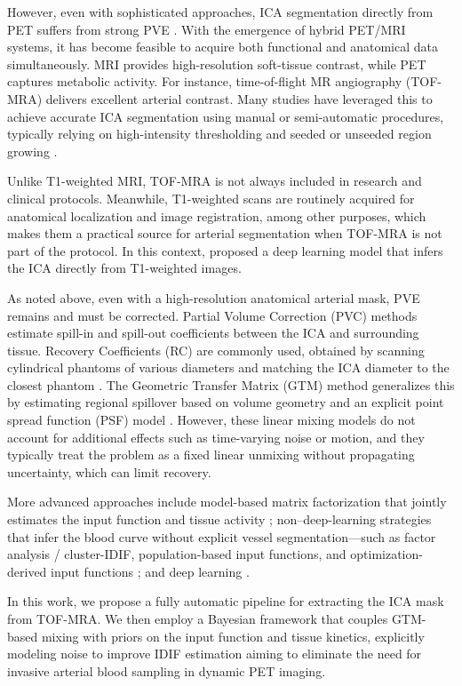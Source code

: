 However, even with sophisticated approaches, ICA segmentation directly from PET suffers from strong PVE \cite{zanotti2011image,boellaard2004effects}.
With the emergence of hybrid PET/MRI systems, it has become feasible to acquire both functional and anatomical data simultaneously.
MRI provides high-resolution soft-tissue contrast, while PET captures metabolic activity.
For instance, time-of-flight MR angiography (TOF-MRA) delivers excellent arterial contrast.
Many studies have leveraged this to achieve accurate ICA segmentation using manual or semi-automatic procedures, typically relying on high-intensity thresholding and seeded or unseeded region growing \cite{feng2015image,sundar2019towards,sari2017estimation,jochimsen2016fully}.

Unlike T1-weighted MRI, TOF-MRA is not always included in research and clinical protocols.
Meanwhile, T1-weighted scans are routinely acquired for anatomical localization and image registration, among other purposes, which makes them a practical source for arterial segmentation when TOF-MRA is not part of the protocol.
In this context, \citeauthor{rahman2024deep} \cite{rahman2024deep} proposed a deep learning model that infers the ICA directly from T1-weighted images.

As noted above, even with a high-resolution anatomical arterial mask, PVE remains and must be corrected.
Partial Volume Correction (PVC) methods estimate spill-in and spill-out coefficients between the ICA and surrounding tissue.
Recovery Coefficients (RC) are commonly used, obtained by scanning cylindrical phantoms of various diameters and matching the ICA diameter to the closest phantom \cite{dassanayake2022caliper,lyoo2014image}.
The Geometric Transfer Matrix (GTM) method generalizes this by estimating regional spillover based on volume geometry and an explicit point spread function (PSF) model \cite{rousset1998correction}.
However, these linear mixing models do not account for additional effects such as time-varying noise or motion, and they typically treat the problem as a fixed linear unmixing without propagating uncertainty, which can limit recovery.

More advanced approaches include model-based matrix factorization that jointly estimates the input function and tissue activity \cite{fang2022image}; non–deep-learning strategies that infer the blood curve without explicit vessel segmentation—such as factor analysis / cluster-IDIF, population-based input functions, and optimization-derived input functions \cite{simoncic2015image,lyoo2014image,dias2022clinical}; and deep learning \cite{kawauchi2023convolutional}.

In this work, we propose a fully automatic pipeline for extracting the ICA mask from TOF-MRA.
We then employ a Bayesian framework that couples GTM-based mixing with priors on the input function and tissue kinetics, explicitly modeling noise to improve IDIF estimation \cite{irace2021bayesian} aiming to eliminate the need for invasive arterial blood sampling in dynamic PET imaging.

